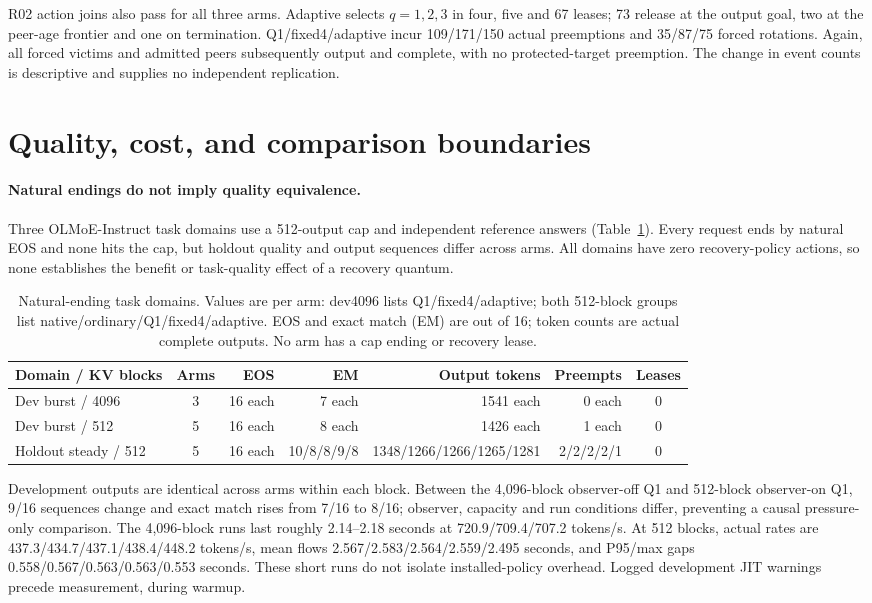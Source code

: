 \documentclass[10pt]{article}
\begin{document}
R02 action joins also pass for all three arms. Adaptive selects $q=1,2,3$ in four, five and 67 leases; 73 release at the output goal, two at the peer-age frontier and one on termination. Q1/fixed4/adaptive incur 109/171/150 actual preemptions and 35/87/75 forced rotations. Again, all forced victims and admitted peers subsequently output and complete, with no protected-target preemption. The change in event counts is descriptive and supplies no independent replication.

\section{Quality, cost, and comparison boundaries}
\paragraph{Natural endings do not imply quality equivalence.}
Three OLMoE-Instruct task domains use a 512-output cap and independent reference answers (Table~\ref{tab:quality}). Every request ends by natural EOS and none hits the cap, but holdout quality and output sequences differ across arms. All domains have zero recovery-policy actions, so none establishes the benefit or task-quality effect of a recovery quantum.

\begin{table}[t]
\centering\small
\setlength{\tabcolsep}{4pt}
\caption{Natural-ending task domains. Values are per arm: dev4096 lists Q1/fixed4/adaptive; both 512-block groups list native/ordinary/Q1/fixed4/adaptive. EOS and exact match (EM) are out of 16; token counts are actual complete outputs. No arm has a cap ending or recovery lease.}
\label{tab:quality}
\begin{tabular}{lcrrrrc}\toprule
Domain / KV blocks & Arms & EOS & EM & Output tokens & Preempts & Leases\\\midrule
Dev burst / 4096 & 3 & 16 each & 7 each & 1541 each & 0 each & 0\\
Dev burst / 512 & 5 & 16 each & 8 each & 1426 each & 1 each & 0\\
Holdout steady / 512 & 5 & 16 each & 10/8/8/9/8 & 1348/1266/1266/1265/1281 & 2/2/2/2/1 & 0\\\bottomrule
\end{tabular}
\end{table}

Development outputs are identical across arms within each block. Between the 4,096-block observer-off Q1 and 512-block observer-on Q1, 9/16 sequences change and exact match rises from 7/16 to 8/16; observer, capacity and run conditions differ, preventing a causal pressure-only comparison. The 4,096-block runs last roughly 2.14--2.18 seconds at 720.9/709.4/707.2 tokens/s. At 512 blocks, actual rates are 437.3/434.7/437.1/438.4/448.2 tokens/s, mean flows 2.567/2.583/2.564/2.559/2.495 seconds, and P95/max gaps 0.558/0.567/0.563/0.563/0.553 seconds. These short runs do not isolate installed-policy overhead. Logged development JIT warnings precede measurement, during warmup.
\end{document}

